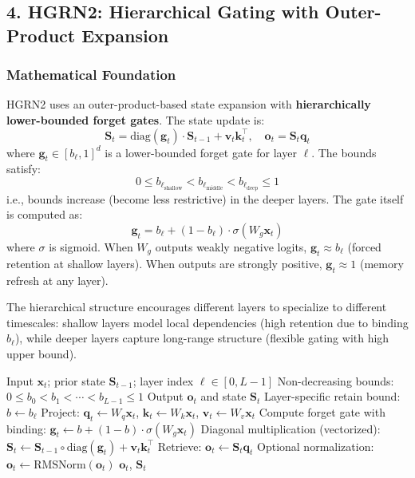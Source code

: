 \documentclass[11pt,a4paper]{article}
\begin{document}
\subsection{4. HGRN2: Hierarchical Gating with Outer-Product Expansion}

\subsubsection{Mathematical Foundation}

HGRN2 \citep{qin_hgrn2_2024} uses an outer-product-based state expansion with \textbf{hierarchically lower-bounded forget gates}. The state update is:
\[
\mathbf{S}_t = \text{diag}(\mathbf{g}_t) \cdot \mathbf{S}_{t-1} + \mathbf{v}_t \mathbf{k}_t^\top, \quad \mathbf{o}_t = \mathbf{S}_t \mathbf{q}_t
\]
where $\mathbf{g}_t \in [b_\ell, 1]^d$ is a lower-bounded forget gate for layer $\ell$. The bounds satisfy:
\[
0 \le b_{\ell_{\text{shallow}}} < b_{\ell_{\text{middle}}} < b_{\ell_{\text{deep}}} \le 1
\]
i.e., bounds increase (become less restrictive) in the deeper layers. The gate itself is computed as:
\[
\mathbf{g}_t = b_\ell + (1 - b_\ell) \cdot \sigma(W_g \mathbf{x}_t)
\]
where $\sigma$ is sigmoid. When $W_g$ outputs weakly negative logits, $\mathbf{g}_t \approx b_\ell$ (forced retention at shallow layers). When outputs are strongly positive, $\mathbf{g}_t \approx 1$ (memory refresh at any layer).

The hierarchical structure encourages different layers to specialize to different timescales: shallow layers model local dependencies (high retention due to binding $b_\ell$), while deeper layers capture long-range structure (flexible gating with high upper bound).

\begin{algorithm}[H]
\caption{HGRN2 Forward with Hierarchical Bounds}
\begin{algorithmic}[1]
\Require Input $\mathbf{x}_t$; prior state $\mathbf{S}_{t-1}$; layer index $\ell \in [0, L-1]$
\Require Non-decreasing bounds: $0 \le b_0 < b_1 < \cdots < b_{L-1} \le 1$
\Ensure Output $\mathbf{o}_t$ and state $\mathbf{S}_t$
\State Layer-specific retain bound: $b \gets b_\ell$
\State Project: $\mathbf{q}_t \gets W_q \mathbf{x}_t$, $\mathbf{k}_t \gets W_k \mathbf{x}_t$, $\mathbf{v}_t \gets W_v \mathbf{x}_t$
\State Compute forget gate with binding: $\mathbf{g}_t \gets b + (1-b) \cdot \sigma(W_g \mathbf{x}_t)$ 
\State Diagonal multiplication (vectorized): $\mathbf{S}_t \gets \mathbf{S}_{t-1} \circ \text{diag}(\mathbf{g}_t) + \mathbf{v}_t \mathbf{k}_t^\top$
\State Retrieve: $\mathbf{o}_t \gets \mathbf{S}_t \mathbf{q}_t$
\State Optional normalization: $\mathbf{o}_t \gets \text{RMSNorm}(\mathbf{o}_t)$
\Return $\mathbf{o}_t$, $\mathbf{S}_t$
\end{algorithmic}
\end{algorithm}
\end{document}
